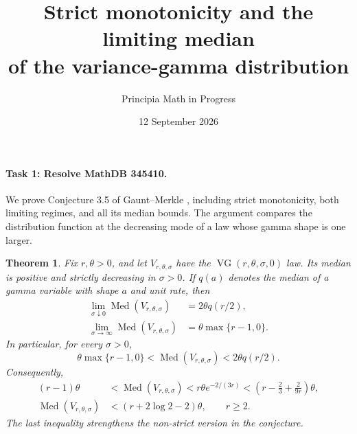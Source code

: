 \documentclass[11pt]{article}
\title{Strict monotonicity and the limiting median\\of the variance-gamma distribution}
\author{Principia Math in Progress}
\date{12 September 2026}
\newtheorem{theorem}{Theorem}
\newcommand{\Med}{\operatorname{Med}}
\begin{document}
\maketitle

\paragraph{Task 1: Resolve MathDB 345410.}
We prove Conjecture 3.5 of Gaunt--Merkle \cite{GM}, including strict
monotonicity, both limiting regimes, and all its median bounds.
The argument compares the distribution function at the decreasing mode
of a law whose gamma shape is one larger.

\begin{theorem}\label{thm:main}
Fix \(r,\theta>0\), and let \(V_{r,\theta,\sigma}\) have the
\(\operatorname{VG}(r,\theta,\sigma,0)\) law. Its median is positive and
strictly decreasing in \(\sigma>0\). If \(q(a)\) denotes the median of
a gamma variable with shape \(a\) and unit rate, then
\begin{align}
 \lim_{\sigma\downarrow0}\Med(V_{r,\theta,\sigma})
   &=2\theta q(r/2),                                       \label{eq:limit0}\\
 \lim_{\sigma\to\infty}\Med(V_{r,\theta,\sigma})
   &=\theta\max\{r-1,0\}.                                  \label{eq:limitinf}
\end{align}
In particular, for every \(\sigma>0\),
\begin{equation}\label{eq:envelopes}
 \theta\max\{r-1,0\}<\Med(V_{r,\theta,\sigma})
                <2\theta q(r/2).
\end{equation}
Consequently,
\begin{align}
 (r-1)\theta
 &<\Med(V_{r,\theta,\sigma})<r\theta e^{-2/(3r)}
   <\left(r-\frac23+\frac{2}{9r}\right)\theta,               \label{eq:bounds}\\
 \Med(V_{r,\theta,\sigma})
 &<(r+2\log2-2)\theta,\qquad r\geq2.                        \label{eq:linear}
\end{align}
The last inequality strengthens the non-strict version in the conjecture.
\end{theorem}
\end{document}
